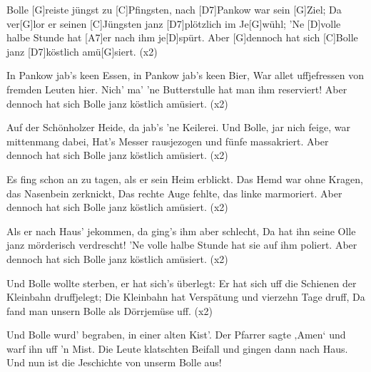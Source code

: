 

\begin{guitar}
	Bolle [G]reiste jüngst zu [C]Pfingsten, nach [D7]Pankow war sein [G]Ziel;
	Da ver[G]lor er seinen [C]Jüngsten janz [D7]plötzlich im Je[G]wühl;
	’Ne [D]volle halbe Stunde hat [A7]er nach ihm je[D]spürt.
	Aber [G]dennoch hat sich [C]Bolle janz [D7]köstlich amü[G]siert. (x2)\vspace{-0.35em}
	
	In Pankow jab’s keen Essen, in Pankow jab’s keen Bier,
	War allet uffjefressen von fremden Leuten hier.
	Nich’ ma’ ’ne Butterstulle hat man ihm reserviert!
	Aber dennoch hat sich Bolle janz köstlich amüsiert. (x2)\vspace{-0.35em}
	
	Auf der Schönholzer Heide, da jab’s ’ne Keilerei.
	Und Bolle, jar nich feige, war mittenmang dabei,
	Hat’s Messer rausjezogen und fünfe massakriert.
	Aber dennoch hat sich Bolle janz köstlich amüsiert. (x2)\vspace{-0.35em}
	
	Es fing schon an zu tagen, als er sein Heim erblickt.
	Das Hemd war ohne Kragen, das Nasenbein zerknickt,
	Das rechte Auge fehlte, das linke marmoriert.
	Aber dennoch hat sich Bolle janz köstlich amüsiert. (x2)\vspace{-0.35em}
	
	Als er nach Haus’ jekommen, da ging’s ihm aber schlecht,
	Da hat ihn seine Olle janz mörderisch verdrescht!
	’Ne volle halbe Stunde hat sie auf ihm poliert.
	Aber dennoch hat sich Bolle janz köstlich amüsiert. (x2)\vspace{-0.35em}
	
	Und Bolle wollte sterben, er hat sich’s überlegt:
	Er hat sich uff die Schienen der Kleinbahn druffjelegt;
	Die Kleinbahn hat Verspätung und vierzehn Tage druff,
	Da fand man unsern Bolle als Dörrjemüse uff. (x2)\vspace{-0.35em}
	
	Und Bolle wurd’ begraben, in einer alten Kist’.
	Der Pfarrer sagte ‚Amen‘ und warf ihn uff ’n Mist.
	Die Leute klatschten Beifall und gingen dann nach Haus.
	Und nun ist die Jeschichte von unserm Bolle aus!\vfill\end{guitar}